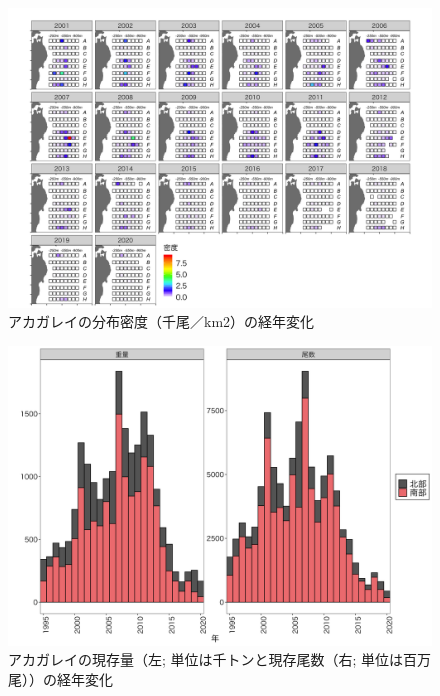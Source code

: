 \documentclass[11pt]{article} %
\begin{document}
\begin{linenumbers}
\begin{figure}[h]
  \centering
  \includegraphics[width = 14cm]{アカガレイdens.png}
  \caption{アカガレイの分布密度（千尾／km2）の経年変化}
\end{figure}

\begin{figure}[h]
  \centering
  \includegraphics[width = 14cm]{アカガレイtrend.png}
  \caption{アカガレイの現存量（左; 単位は千トンと現存尾数（右; 単位は百万尾））の経年変化}
\end{figure}


\end{linenumbers}
\end{document}
